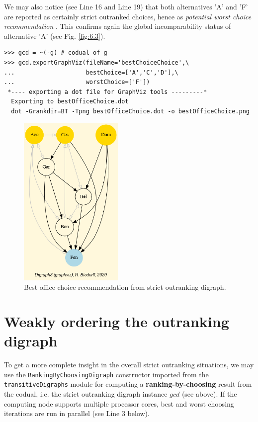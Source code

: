 We may also notice (see Line 16 and Line 19) that both alternatives 'A' and 'F' are reported as certainly strict outranked choices, hence as \emph{potential worst choice recommendation} . This confirms again the global incomparability status of alternative 'A' (see Fig. \ref{fig:6.3}).

\begin{lstlisting}
>>> gcd = ~(-g) # codual of g
>>> gcd.exportGraphViz(fileName='bestChoiceChoice',\
...                    bestChoice=['A','C','D'],\
...                    worstChoice=['F'])
 *---- exporting a dot file for GraphViz tools ---------*
  Exporting to bestOfficeChoice.dot
  dot -Grankdir=BT -Tpng bestOfficeChoice.dot -o bestOfficeChoice.png
\end{lstlisting}

\begin{figure}[h]
\sidecaption
\includegraphics[width=5cm]{Figures/bestOfficeChoice.png}
\caption{Best office choice recommendation from strict outranking digraph.}
\label{fig:6.4}       %
\end{figure}

\section{Weakly ordering the outranking digraph}
\label{sec:6.6}

To get a more complete insight in the overall strict outranking situations, we may use the \texttt{RankingByChoosingDigraph} constructor imported from the \texttt{transitiveDigraphs} module for computing a \textbf{ranking-by-choosing} result from the codual, i.e. the strict outranking digraph instance $gcd$ (see above). If the computing node supports multiple processor cores, best and worst choosing iterations are run in parallel (see Line 3 below).

